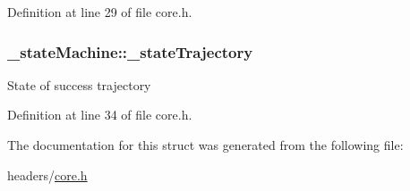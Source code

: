 Definition at line 29 of file core.\-h.

\hypertarget{struct__state_machine_a88c6e0c15cdd29b3eec2e842fa09b08f}{
\subsubsection[{\-\_\-state\-Trajectory}]{ \-\_\-state\-Machine\-::\-\_\-state\-Trajectory}}\label{struct__state_machine_a88c6e0c15cdd29b3eec2e842fa09b08f}
State of success trajectory 

Definition at line 34 of file core.\-h.



The documentation for this struct was generated from the following file\-:\begin{DoxyCompactItemize}
\item 
headers/\hyperlink{core_8h}{core.\-h}\end{DoxyCompactItemize}
